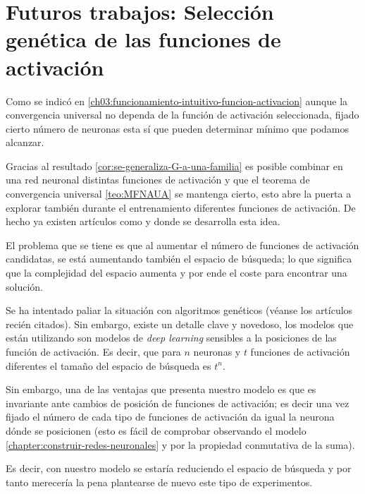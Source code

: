 \newpage
\chapter{Futuros trabajos: Selección genética de las funciones de activación }
\label{ch08:genetic-selection}

Como se indicó en \ref{ch03:funcionamiento-intuitivo-funcion-activacion}
aunque la convergencia universal no 
dependa de la función de activación seleccionada,
fijado cierto número de neuronas esta sí que pueden 
determinar mínimo que podamos alcanzar.  

Gracias al resultado \ref{cor:se-generaliza-G-a-una-familia} es posible combinar en una red neuronal distintas funciones de activación y que el teorema de convergencia universal \ref{teo:MFNAUA} se mantenga cierto, esto abre la puerta a explorar también durante el entrenamiento diferentes funciones de activación. De hecho ya existen artículos como \cite{FunctionOptimizationwithGeneticAlgorithms} y \cite{Genetic-deep-neural-networks} donde se desarrolla esta idea. 

El problema que se tiene es que al aumentar
el número de funciones de activación candidatas, se está aumentando también el espacio de búsqueda; lo que significa que la complejidad del espacio aumenta y por ende el coste para encontrar una solución. 

Se ha intentado paliar la situación con algoritmos genéticos (véanse los artículos recién citados). Sin embargo, existe un detalle clave y novedoso, los modelos que 
están utilizando son modelos de \textit{deep learning} sensibles a la posiciones de las función de activación. Es decir, que para $n$ neuronas y $t$ funciones de activación diferentes el tamaño del espacio de búsqueda es $t^n$.


Sin embargo, una de las ventajas que presenta nuestro modelo es que es invariante ante cambios de posición de funciones de activación; es decir una vez fijado el número de cada tipo de funciones de activación da igual la neurona dónde se posicionen (esto es fácil de comprobar observando el modelo \ref{chapter:construir-redes-neuronales} y por la propiedad conmutativa de la suma).

Es decir, con nuestro modelo se estaría reduciendo el espacio de búsqueda y por tanto merecería la pena plantearse de nuevo este tipo de experimentos. 

